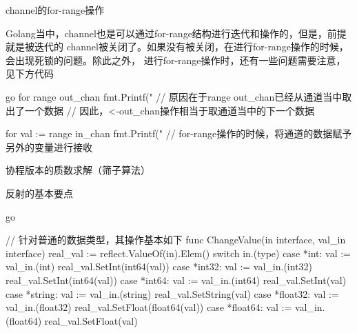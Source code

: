 \begin{outline}[enumerate]
  \1 channel的for-range操作

  Golang当中，channel也是可以通过for-range结构进行迭代和操作的，但是，前提就是被迭代的
  channel被关闭了。如果没有被关闭，在进行for-range操作的时候，会出现死锁的问题。除此之外，
  进行for-range操作时，还有一些问题需要注意，见下方代码

\begin{code-in-enumerate}{go}
for range out_chan {
    fmt.Printf("%
                                   // 原因在于range out_chan已经从通道当中取出了一个数据
                                   // 因此，<-out_chan操作相当于取通道当中的下一个数据
}

for val := range in_chan {
    fmt.Printf("%
                                  // for-range操作的时候，将通道的数据赋予另外的变量进行接收
}
\end{code-in-enumerate}

  \1 协程版本的质数求解（筛子算法）


  \1 反射的基本要点

\begin{code-in-enumerate}{go}

// 针对普通的数据类型，其操作基本如下
func ChangeValue(in interface{}, val_in interface{}) {
    real_val := reflect.ValueOf(in).Elem()
    switch in.(type) {
    case *int:
        val := val_in.(int)
        real_val.SetInt(int64(val))
    case *int32:
        val := val_in.(int32)
        real_val.SetInt(int64(val))
    case *int64:
        val := val_in.(int64)
        real_val.SetInt(val)
    case *string:
        val := val_in.(string)
        real_val.SetString(val)
    case *float32:
        val := val_in.(float32)
        real_val.SetFloat(float64(val))
    case *float64:
        val := val_in.(float64)
        real_val.SetFloat(val)
    }
}


\end{code-in-enumerate}
\end{outline}
